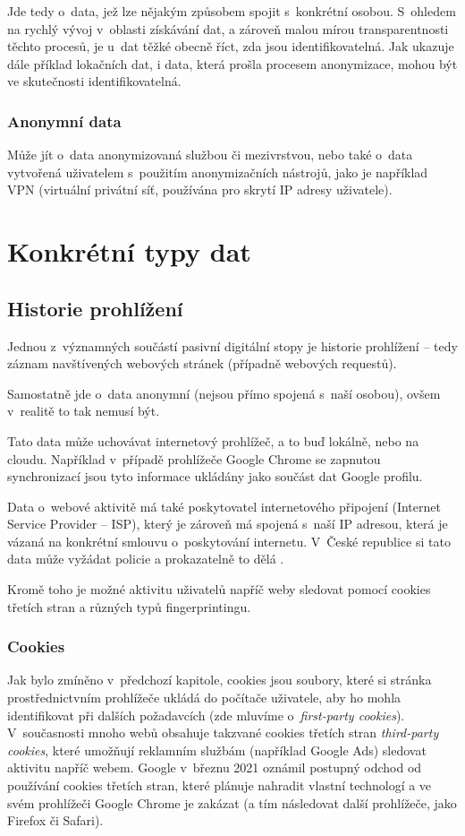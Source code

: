 Jde tedy o~data, jež lze nějakým způsobem spojit s~konkrétní osobou. S~ohledem na rychlý vývoj v~oblasti získávání dat, a zároveň malou mírou transparentnosti těchto procesů, je u~dat těžké obecně říct, zda jsou identifikovatelná. Jak ukazuje dále příklad lokačních dat, i data, která prošla procesem anonymizace, mohou být ve skutečnosti identifikovatelná.  

\subsubsection*{Anonymní data}

Může jít o~data anonymizovaná službou či mezivrstvou, nebo také o~data vytvořená uživatelem s~použitím anonymizačních nástrojů, jako je například VPN (virtuální privátní síť, používána pro skrytí IP adresy uživatele).


\section{Konkrétní typy dat}

\subsection{Historie prohlížení}
Jednou z~významných součástí pasivní digitální stopy je historie prohlížení -- tedy záznam navštívených webových stránek (případně webových requestů).


Samostatně jde o~data anonymní (nejsou přímo spojená s~naší osobou), ovšem v~realitě to tak nemusí být.

Tato data může uchovávat internetový prohlížeč, a to buď lokálně, nebo na cloudu. Například v~případě prohlížeče Google Chrome se zapnutou synchronizací jsou tyto informace ukládány jako součást dat Google profilu.

Data o~webové aktivitě má také poskytovatel internetového připojení (Internet Service Provider -- ISP), který je zároveň má spojená s~naší IP adresou, která je vázaná na konkrétní smlouvu o~poskytování internetu. V~České republice si tato data může vyžádat policie a prokazatelně to dělá \citep{policie-isp}.

Kromě toho je možné aktivitu uživatelů napříč weby sledovat pomocí cookies třetích stran a různých typů fingerprintingu.

\subsubsection*{Cookies}
Jak bylo zmíněno v~předchozí kapitole, cookies jsou soubory, které si stránka prostřednictvním prohlížeče ukládá do počítače uživatele, aby ho mohla identifikovat při dalších požadavcích (zde mluvíme o~\textit{first-party cookies}). V~současnosti mnoho webů obsahuje takzvané cookies třetích stran \textit{third-party cookies}, které umožňují reklamním službám (například Google Ads) sledovat aktivitu napříč webem.
Google v~březnu 2021 oznámil postupný odchod od používání cookies třetích stran, které plánuje nahradit vlastní technologí a ve svém prohlížeči Google Chrome je zakázat (a tím následovat další prohlížeče, jako Firefox či Safari).

